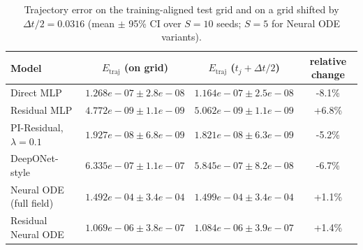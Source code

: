 \begin{table}[t]
\centering
\small
\caption{Trajectory error on the training-aligned test grid and on a grid shifted by $\Delta t/2 = 0.0316$ (mean $\pm$ 95\% CI over $S=10$ seeds; $S=5$ for Neural ODE variants).}
\label{tab:offgrid_time}
\begin{tabular}{lccc}
\hline
Model & $E_{\mathrm{traj}}$ (on grid) & $E_{\mathrm{traj}}$ ($t_j+\Delta t/2$) & relative change \\
\hline
Direct MLP & $1.268e-07 \pm 2.8e-08$ & $1.164e-07 \pm 2.5e-08$ & -8.1\% \\
Residual MLP & $4.772e-09 \pm 1.1e-09$ & $5.062e-09 \pm 1.1e-09$ & +6.8\% \\
PI-Residual, $\lambda=0.1$ & $1.927e-08 \pm 6.8e-09$ & $1.821e-08 \pm 6.3e-09$ & -5.2\% \\
DeepONet-style & $6.335e-07 \pm 1.1e-07$ & $5.845e-07 \pm 8.2e-08$ & -6.7\% \\
Neural ODE (full field) & $1.492e-04 \pm 3.4e-04$ & $1.499e-04 \pm 3.4e-04$ & +1.1\% \\
Residual Neural ODE & $1.069e-06 \pm 3.8e-07$ & $1.084e-06 \pm 3.9e-07$ & +1.4\% \\
\hline
\end{tabular}
\end{table}